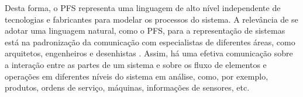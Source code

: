 Desta forma, o PFS representa uma linguagem de alto nível independente de tecnologias e fabricantes para modelar os processos do sistema. A relevância de se adotar uma linguagem natural, como o PFS, para a representação de sistemas está na padronização da comunicação com especialistas de diferentes áreas, como arquitetos, engenheiros e desenhistas \cite{pisching2018pfs}. Assim, há uma efetiva comunicação sobre a interação entre as partes de um sistema e sobre os fluxo de elementos e operações em diferentes níveis do sistema em análise, como, por exemplo, produtos, ordens de serviço, máquinas, informações de sensores, etc.

